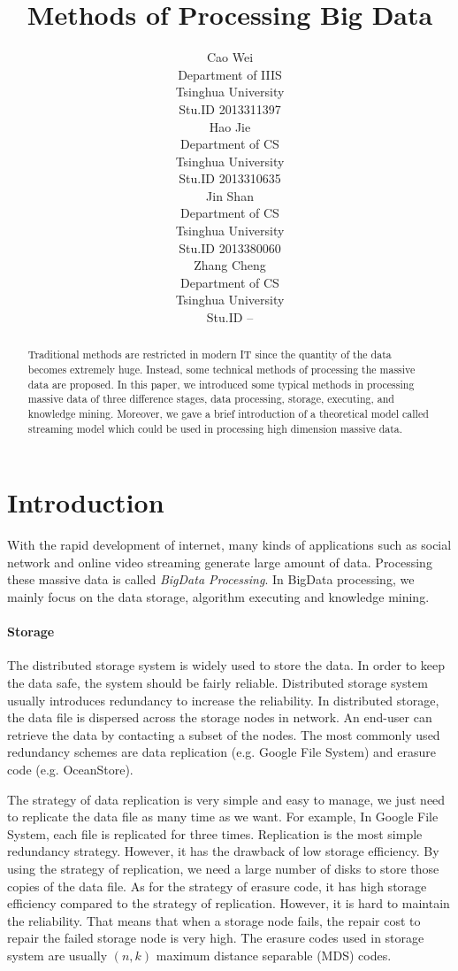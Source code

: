 \documentclass{article} %
\title{Methods of Processing Big Data}
\author{
Cao Wei \\
Department of IIIS\\
Tsinghua University\\
Stu.ID 2013311397 \\
\And
Hao Jie \\
Department of CS\\
Tsinghua University\\
Stu.ID 2013310635 \\
\And
Jin Shan \\
Department of CS\\
Tsinghua University\\
Stu.ID 2013380060 \\
\And
Zhang Cheng \\
Department of CS\\
Tsinghua University\\
Stu.ID -- \\
}
\begin{document}
\maketitle

\begin{abstract}
Traditional methods are restricted in modern IT since the quantity of the data becomes extremely huge. Instead, some technical methods of processing the massive data are proposed. In this paper, we introduced some typical methods in processing massive data of three difference stages, data processing, storage, executing, and knowledge mining. Moreover, we gave a brief introduction of a theoretical model called streaming model which could be used in processing high dimension massive data.
\end{abstract}

\section{Introduction}
 With the rapid development of internet, many kinds of applications such as social network and online video streaming generate large amount of data. Processing these massive data is called \emph{BigData Processing}. In BigData processing, we mainly focus on the data storage, algorithm executing and knowledge mining.
 
 \paragraph{Storage}The distributed storage system is widely used to store the data. In order to keep the data safe, the system should be fairly reliable. Distributed storage system usually introduces redundancy to increase the reliability. In distributed storage, the data file is dispersed across the storage nodes in network. An end-user can retrieve the data by contacting a subset of the nodes. The most commonly used redundancy schemes are data replication (e.g. Google File System) and erasure code (e.g. OceanStore).

The strategy of data replication is very simple and easy to manage, we just need to replicate the data file as many time as we want. For example, In Google File System, each file is replicated for three times. Replication is the most simple redundancy strategy. However, it has the drawback of low storage efficiency. By using the strategy of replication, we need a large number of disks to store those copies of the data file. As for the strategy of erasure code, it has high storage efficiency compared to the strategy of replication. However, it is hard to maintain the reliability. That means that when a storage node fails, the repair cost to repair the failed storage node is very high. The erasure codes used in storage system are usually $(n, k)$ maximum distance separable (MDS) codes.
\end{document}
